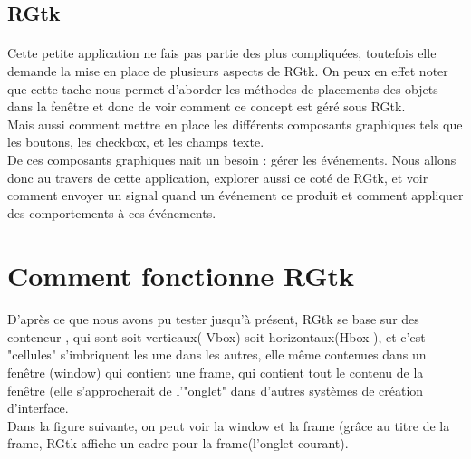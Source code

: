 \documentclass{article}
\begin{document}
\subsection{RGtk}
\paragraph{} 
Cette petite application ne fais pas partie des plus compliquées, toutefois elle demande la mise en place de plusieurs aspects de RGtk. On peux en effet noter que cette tache nous permet d'aborder les méthodes de placements des objets dans la fenêtre et donc de voir comment ce concept est géré sous RGtk.\\
Mais aussi comment mettre en place les différents composants graphiques tels que les boutons, les checkbox, et les champs texte.\\
De ces composants graphiques nait un besoin : gérer les événements. Nous allons donc au travers de cette application, explorer aussi ce coté de RGtk, et voir comment envoyer un signal quand un événement ce produit et comment appliquer des comportements à ces événements.\\

\newpage

\section{Comment fonctionne RGtk}
\paragraph{} 
D'après ce que nous avons pu tester jusqu'à présent, RGtk se base sur des conteneur , qui sont soit verticaux( Vbox) soit horizontaux(Hbox ), et c'est "cellules" s'imbriquent les une dans les autres, elle même contenues dans un fenêtre (window) qui contient une frame, qui contient tout le contenu de la fenêtre (elle s’approcherait de l'"onglet" dans d'autres systèmes de création d'interface.\\

Dans la figure suivante, on peut voir la window et la frame (grâce au titre de la frame, RGtk affiche un cadre pour la frame(l'onglet courant).\\
\end{document}
